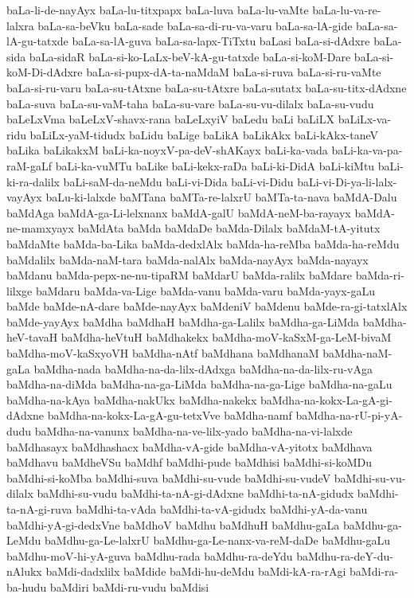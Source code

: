 {baLa-li-de-nayAyx
baLa-lu-titxpapx
baLa-luva
baLa-lu-vaMte
baLa-lu-va-re-lalxra
baLa-sa-beVku
baLa-sade
baLa-sa-di-ru-va-varu
baLa-sa-lA-gide
baLa-sa-lA-gu-tatxde
baLa-sa-lA-guva
baLa-sa-lapx-TiTxtu
baLasi
baLa-si-dAdxre
baLa-sida
baLa-sidaR
baLa-si-ko-LaLx-beV-kA-gu-tatxde
baLa-si-koM-Dare
baLa-si-koM-Di-dAdxre
baLa-si-pupx-dA-ta-naMdaM
baLa-si-ruva
baLa-si-ru-vaMte
baLa-si-ru-varu
baLa-su-tAtxne
baLa-su-tAtxre
baLa-sutatx
baLa-su-titx-dAdxne
baLa-suva
baLa-su-vaM-taha
baLa-su-vare
baLa-su-vu-dilalx
baLa-su-vudu
baLeLxVma
baLeLxV-shavx-rana
baLeLxyiV
baLedu
baLi
baLiLX
baLiLx-va-ridu
baLiLx-yaM-tidudx
baLidu
baLige
baLikA
baLikAkx
baLi-kAkx-taneV
baLika
baLikakxM
baLi-ka-noyxV-pa-deV-shAKayx
baLi-ka-vada
baLi-ka-va-pa-raM-gaLf
baLi-ka-vuMTu
baLike
baLi-kekx-raDa
baLi-ki-DidA
baLi-kiMtu
baLi-ki-ra-dalilx
baLi-saM-da-neMdu
baLi-vi-Dida
baLi-vi-Didu
baLi-vi-Di-ya-li-lalx-vayAyx
baLu-ki-lalxde
baMTana
baMTa-re-lalxrU
baMTa-ta-nava
baMdA-Dalu
baMdAga
baMdA-ga-Li-lelxnanx
baMdA-galU
baMdA-neM-ba-rayayx
baMdA-ne-mamxyayx
baMdAta
baMda
baMdaDe
baMda-Dilalx
baMdaM-tA-yitutx
baMdaMte
baMda-ba-Lika
baMda-dedxlAlx
baMda-ha-reMba
baMda-ha-reMdu
baMdalilx
baMda-naM-tara
baMda-nalAlx
baMda-nayAyx
baMda-nayayx
baMdanu
baMda-pepx-ne-nu-tipaRM
baMdarU
baMda-ralilx
baMdare
baMda-ri-lilxge
baMdaru
baMda-va-Lige
baMda-vanu
baMda-varu
baMda-yayx-gaLu
baMde
baMde-nA-dare
baMde-nayAyx
baMdeniV
baMdenu
baMde-ra-gi-tatxlAlx
baMde-yayAyx
baMdha
baMdhaH
baMdha-ga-Lalilx
baMdha-ga-LiMda
baMdha-heV-tavaH
baMdha-heVtuH
baMdhakekx
baMdha-moV-kaSxM-ga-LeM-bivaM
baMdha-moV-kaSxyoVH
baMdha-nAtf
baMdhana
baMdhanaM
baMdha-naM-gaLa
baMdha-nada
baMdha-na-da-lilx-dAdxga
baMdha-na-da-lilx-ru-vAga
baMdha-na-diMda
baMdha-na-ga-LiMda
baMdha-na-ga-Lige
baMdha-na-gaLu
baMdha-na-kAya
baMdha-nakUkx
baMdha-nakekx
baMdha-na-kokx-La-gA-gi-dAdxne
baMdha-na-kokx-La-gA-gu-tetxVve
baMdha-namf
baMdha-na-rU-pi-yA-dudu
baMdha-na-vanunx
baMdha-na-ve-lilx-yado
baMdha-na-vi-lalxde
baMdhasayx
baMdhashacx
baMdha-vA-gide
baMdha-vA-yitotx
baMdhava
baMdhavu
baMdheVSu
baMdhf
baMdhi-pude
baMdhisi
baMdhi-si-koMDu
baMdhi-si-koMba
baMdhi-suva
baMdhi-su-vude
baMdhi-su-vudeV
baMdhi-su-vu-dilalx
baMdhi-su-vudu
baMdhi-ta-nA-gi-dAdxne
baMdhi-ta-nA-gidudx
baMdhi-ta-nA-gi-ruva
baMdhi-ta-vAda
baMdhi-ta-vA-gidudx
baMdhi-yA-da-vanu
baMdhi-yA-gi-dedxVne
baMdhoV
baMdhu
baMdhuH
baMdhu-gaLa
baMdhu-ga-LeMdu
baMdhu-ga-Le-lalxrU
baMdhu-ga-Le-nanx-va-reM-daDe
baMdhu-gaLu
baMdhu-moV-hi-yA-guva
baMdhu-rada
baMdhu-ra-deYdu
baMdhu-ra-deY-du-nAlukx
baMdi-dadxlilx
baMdide
baMdi-hu-deMdu
baMdi-kA-ra-rAgi
baMdi-ra-ba-hudu
baMdiri
baMdi-ru-vudu
baMdisi
}
